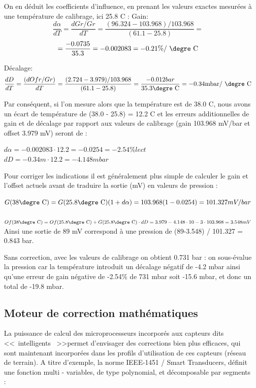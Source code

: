 On en déduit les coefficients d'influence, en prenant les valeurs exactes mesurées à une température de calibrage, ici 25.8 \degre C :
Gain:
\[
\frac{d\alpha}{dT} = \frac{dGr/Gr}{dT} = \frac{(96.324-103.968)/103.968}{ (61.1-25.8)} =\]
\begin{equation}
= \frac{-0.0735}{35.3} = -0.002083 = -0.21 \% \text{/ \degre C}
\end{equation}

Décalage:
\begin{equation}
\frac{dD}{dT} = \frac{(dOfr/Gr)}{dT} = \frac{(2.724-3.979)/103.968}{(61.1-25.8)} =
 \frac{-0.012 bar}{ 35.3 \text{\degre C}} = -0.34 \text{mbar/ \degre C}
\end{equation}

Par conséquent, si l'on mesure alors que la température est de 38.0 \degre C, nous avons un écart de température de (38.0 - 25.8) = 12.2 \degre C et les erreurs additionnelles de gain et de décalage par rapport aux valeurs de calibrage (gain 103.968 mV/bar et offset 3.979 mV) seront de :

$d\alpha = -0.002083 \cdot 12.2 = -0.0254 = -2.54 \% lect $
\\
$dD = -0.34 m \cdot 12.2 = - 4.148 mbar $

Pour corriger les indications il est généralement plus simple de calculer le gain et l'offset actuels avant de traduire la sortie (mV) en valeurs de pression :

$G(38 \text{\degre C}) = G(25.8 \text{\degre C}) (1 + d \alpha) = 103.968(1-0.0254) = 101.327 mV/bar $
\\
\\
$Of(38 \text{\degre C}) = Of(25.8 \text{\degre C}) + G(25.8 \text{\degre C}) \cdot dD = 3.979 - 4.148 \cdot 10-3 \cdot 103.968 = 3.548 mV$
\\

Ainsi une sortie de 89 mV correspond à une pression de (89-3.548) / 101.327 = 0.843 bar.

Sans correction, avec les valeurs de calibrage on obtient 0.731 bar : on sous-évalue la pression car la température introduit un décalage négatif de -4.2 mbar ainsi qu'une erreur de gain négative de -2.54\% de 731 mbar soit -15.6 mbar, et donc un total de -19.8 mbar.

\subsection{Moteur de correction mathématiques}

La puissance de calcul des microprocesseurs incorporés aux capteurs dits \textless\textless\ intelligents \ \textgreater\textgreater permet d'envisager des corrections bien plus efficaces, qui sont maintenant incorporées dans les profils d'utilisation de ces capteurs (réseau de terrain).
A titre d'exemple, la norme IEEE-1451 / Smart Transducers, définit une fonction multi - variables, de type polynomial, et décomposable par segments :

